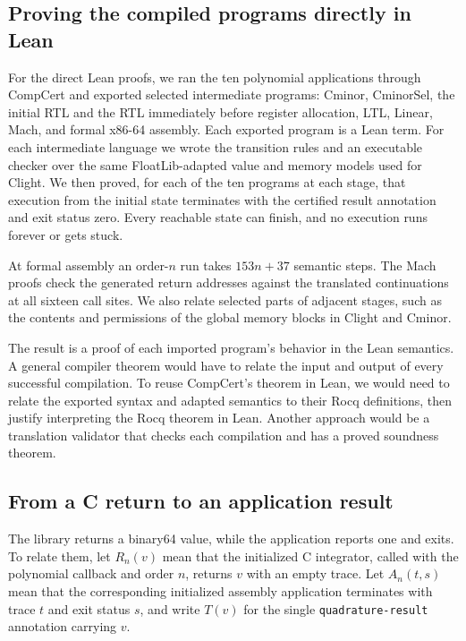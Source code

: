 \documentclass[11pt]{article}
\newcommand{\code}[1]{%
  \ifmmode\text{\texttt{\detokenize{#1}}}\else\nolinkurl{#1}\fi}
\begin{document}
\subsection{Proving the compiled programs directly in Lean}

For the direct Lean proofs, we ran the ten
polynomial applications through CompCert and exported selected intermediate
programs: Cminor, CminorSel, the initial RTL and the RTL immediately before
register allocation, LTL, Linear, Mach, and formal x86-64 assembly.
Each exported program is a Lean term. For each intermediate language we
wrote the transition
rules and an executable checker over the same FloatLib-adapted value and
memory models used for Clight. We then proved, for each of the ten
programs at each stage, that execution from the initial state terminates
with the certified result annotation and exit status zero. Every reachable
state can finish, and no execution runs forever or gets stuck.

At formal assembly an order-$n$ run takes $153n+37$ semantic steps.
The Mach proofs check the generated return addresses against the translated
continuations at all sixteen call sites. We also relate selected parts of
adjacent stages, such as the contents and permissions of the global memory
blocks in Clight and Cminor.

The result is a proof of each imported program's behavior in the Lean
semantics. A general compiler theorem would have to relate the input and
output of every successful compilation. To reuse CompCert's theorem in
Lean, we would need to relate the exported syntax and adapted semantics to
their Rocq definitions, then justify interpreting the Rocq theorem in Lean.
Another approach would be a translation validator that checks each
compilation and has a proved soundness theorem.

\subsection{From a C return to an application result}

The library returns a binary64 value, while the application reports one
and exits. To relate them, let $R_n(v)$ mean that the initialized C
integrator, called with the polynomial callback and order $n$, returns $v$
with an empty trace. Let $A_n(t,s)$ mean that the corresponding initialized
assembly application terminates with trace $t$ and exit status $s$, and
write $T(v)$ for the single \code{quadrature-result} annotation carrying $v$.
\end{document}
